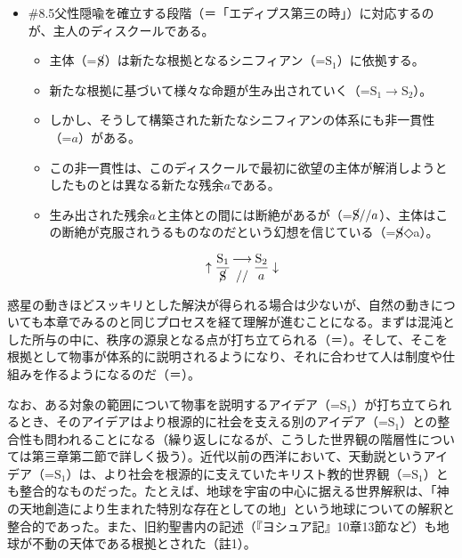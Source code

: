 \begin{note}{}
  \begin{itemize}
    \tightlist
    \item{\#8.5}父性隠喩を確立する段階（＝「エディプス第三の時」）に対応するのが、主人のディスクールである。
      \begin{itemize}
        \tightlist
        \item 主体（=$\cancel{\textrm{S}}$）は新たな根拠となるシニフィアン（=$\textrm{S}_1$）に依拠する。
        \item 新たな根拠に基づいて様々な命題が生み出されていく（=$\textrm{S}_1\rightarrow\textrm{S}_2$）。
        \item しかし、そうして構築された新たなシニフィアンの体系にも非一貫性（=$a$）がある。
        \item この非一貫性は、このディスクールで最初に欲望の主体が解消しようとしたものとは異なる新たな残余$a$である。
        \item 生み出された残余$a$と主体との間には断絶があるが（=$\cancel{\textrm{S}}//a$）、主体はこの断絶が克服されうるものなのだという幻想を信じている（=$\cancel{\textrm{S}}$◇a）。
      \end{itemize}

$$
\uparrow\frac{\mathrm{S_1}}{\cancel{\textrm{S}}}\genfrac{}{}{0pt}{}{\longrightarrow}{//}\frac{\mathrm{S_2}}{a}\downarrow
$$
  \end{itemize}
\end{note}

惑星の動きほどスッキリとした解決が得られる場合は少ないが、自然の動きについても本章でみるのと同じプロセスを経て理解が進むことになる。まずは混沌とした所与の中に、秩序の源泉となる点が打ち立てられる（＝）。そして、そこを根拠として物事が体系的に説明されるようになり、それに合わせて人は制度や仕組みを作るようになるのだ（＝）。

なお、ある対象の範囲について物事を説明するアイデア（=\(\textrm{S}_1\)）が打ち立てられるとき、そのアイデアはより根源的に社会を支える別のアイデア（=\(\textrm{S}_1\)）との整合性も問われることになる（繰り返しになるが、こうした世界観の階層性については第三章第二節で詳しく扱う）。近代以前の西洋において、天動説というアイデア（=\(\textrm{S}_1\)）は、より社会を根源的に支えていたキリスト教的世界観（=\(\textrm{S}_1\)）とも整合的なものだった。たとえば、地球を宇宙の中心に据える世界解釈は、「神の天地創造により生まれた特別な存在としての地」という地球についての解釈と整合的であった。また、旧約聖書内の記述（『ヨシュア記』10章13節など）も地球が不動の天体である根拠とされた（註1）。

